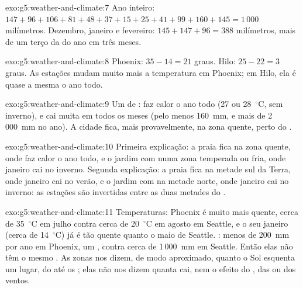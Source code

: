 \begin{solution}{exo:g5:weather-and-climate:7}
Ano inteiro: $147 + 96 + 106 + 81 + 48 + 37 + 15 + 25 + 41 + 99 + 160 + 145
= 1\,000$ milímetros. Dezembro, janeiro e fevereiro:
$145 + 147 + 96 = 388$ milímetros, mais de um terço da  do ano em
três meses.
\end{solution}

\begin{solution}{exo:g5:weather-and-climate:8}
Phoenix: $35 - 14 = 21$ graus. Hilo: $25 - 22 = 3$ graus. As estações
mudam muito mais a temperatura em Phoenix; em Hilo, ela é quase a mesma o
ano todo.
\end{solution}

\begin{solution}{exo:g5:weather-and-climate:9}
Um  de : faz calor o ano todo (27 ou
28~$^\circ$C, sem inverno), e cai muita  em todos os meses (pelo menos
160~mm, e mais de 2\,000~mm no ano). A cidade fica, mais provavelmente, na
zona quente, perto do .
\end{solution}

\begin{solution}{exo:g5:weather-and-climate:10}
Primeira explicação: a praia fica na zona quente, onde faz calor o ano
todo, e o jardim com  numa zona temperada ou fria, onde janeiro cai no
inverno. Segunda explicação: a praia fica na metade sul da Terra, onde
janeiro cai no verão, e o jardim com  na metade norte, onde janeiro
cai no inverno: as estações são invertidas entre as duas metades do .
\end{solution}

\begin{solution}{exo:g5:weather-and-climate:11}
Temperaturas: Phoenix é muito mais quente, cerca de 35~$^\circ$C em julho
contra cerca de 20~$^\circ$C em agosto em Seattle, e o seu janeiro (cerca
de 14~$^\circ$C) já é tão quente quanto o maio de Seattle. : menos de
200~mm por ano em Phoenix, um , contra cerca de 1\,000~mm em
Seattle. Então elas não têm o mesmo . As zonas nos dizem, de modo
aproximado, quanto o Sol esquenta um lugar, do  até os ; elas
não nos dizem quanta  cai, nem o efeito do , das  ou dos
ventos.
\end{solution}
